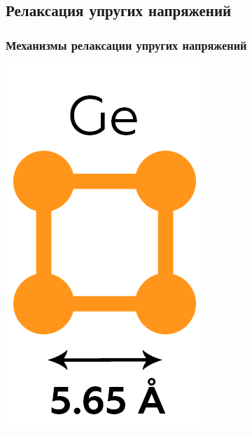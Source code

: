 \documentclass[10pt,pdf,hyperref={unicode}, dvipsnames]{beamer}
\begin{document}
\subsection{Релаксация упругих напряжений}
\begin{frame}[t]
	\vfill
	\frametitle{Механизмы релаксации упругих напряжений}
	\centering
	\begin{minipage}{0.15\linewidth}
		\vfill
		\includegraphics[width=\linewidth]{imgs/Gecell.png}
		\vfill


\end{minipage}
\end{frame}
\end{document}
